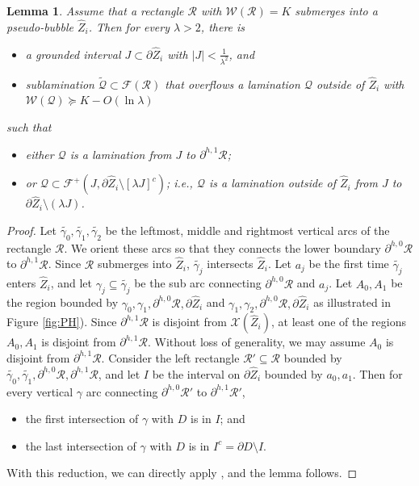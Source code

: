 \documentclass[11pt, reqno]{amsart}
\numberwithin{equation}{section}
\theoremstyle{plain}
\theoremstyle{theorem}
\newtheorem{lem}[theorem]{Lemma}
\theoremstyle{plain}
\theoremstyle{definition}
\numberwithin{figure}{section}
\newcommand{\Fam}{{\mathcal F}}
\newcommand{\Width}{{\mathcal W}}
\newcommand\RR{\mathcal{R}}
\newcommand\XX{\mathcal{X}}
\newcommand{\wZ}{{\widehat Z}}
\begin{document}
\begin{lem}
\label{lem:rect through PB}
Assume that a rectangle $\RR$ with $\Width(\RR)=K$ submerges into a pseudo-bubble $\wZ_i$. Then for every $\lambda>2$, there is 
\begin{itemize}
   \item  a grounded interval $J\subset \partial \wZ_i$ with $|J|<\frac{1}{\lambda^2}$, and
   \item sublamination $\widetilde {\mathcal Q}\subset \Fam(\RR)$ that overflows a lamination $\mathcal Q$ outside of $\wZ_i$ with  $\Width({\mathcal Q})\succeq K- O(\ln \lambda)$
\end{itemize}
such that
\begin{itemize}
    \item either $\mathcal Q$ is a lamination from $J$ to $\partial^{h,1} \RR$;
    \item or $\mathcal Q \subset \Fam^+ (J, \partial \wZ_i\setminus [\lambda J]^c)$; i.e., $\mathcal Q$ is a lamination outside of $\wZ_i$ from $J$ to $\partial \wZ_i\setminus (\lambda J)$.
\end{itemize}
\end{lem}
\begin{proof}
    Let $\widetilde{\gamma_0}, \widetilde{\gamma_1}, \widetilde{\gamma_2}$ be the leftmost, middle and rightmost vertical arcs of the rectangle $\RR$.
    We orient these arcs so that they connects the lower boundary $\partial^{h,0}\RR$ to $\partial^{h,1}\RR$.
    Since $\RR$ submerges into $\wZ_i$, $\widetilde{\gamma_j}$ intersects $\wZ_i$.
    Let $a_j$ be the first time $\widetilde{\gamma_j}$ enters $\wZ_i$, and let $\gamma_j \subseteq \widetilde{\gamma_j}$ be the sub arc connecting $\partial^{h,0}\RR$ and $a_j$.
    Let $A_0, A_1$ be the region bounded by $\gamma_0, \gamma_{1}, \partial^{h,0}\RR, \partial \wZ_i$ and $\gamma_1, \gamma_{2}, \partial^{h,0}\RR, \partial \wZ_i$ as illustrated in Figure \ref{fig:PH}).
    Since $\partial^{h,1}\RR$ is disjoint from $\XX(\wZ_i)$, at least one of the regions $A_0, A_1$ is disjoint from $\partial^{h,1}\RR$.
    Without loss of generality, we may assume $A_0$ is disjoint from $\partial^{h,1}\RR$.
    Consider the left rectangle $\RR' \subseteq \RR$ bounded by $\widetilde{\gamma_0}, \widetilde{\gamma_1}, \partial^{h,0}\RR, \partial^{h,1}\RR$, and let $I$ be the interval on $\partial \wZ_i$ bounded by $a_0, a_1$.
    Then for every vertical $\gamma$ arc connecting $\partial^{h,0}\RR'$ to $\partial^{h,1}\RR'$, 
    \begin{itemize}
    \item the first intersection of $\gamma$ with $D$ is in $I$; and
    \item the last intersection of $\gamma$ with $D$ is in $I^c=\partial D\setminus I$.
    \end{itemize}
    With this reduction, we can directly apply \cite[Lemma 6.9] {DL22}, and the lemma follows.
\end{proof}
\end{document}
